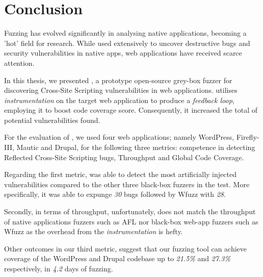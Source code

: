 \chapter{Conclusion}
\label{sec:conclusion}
\vspace*{0.25cm}

Fuzzing has evolved significantly in analysing native applications, becoming a 'hot' field for research. While used extensively to uncover destructive bugs and security vulnerabilities in native apps, web applications have received scarce attention.

In this thesis, we presented \pname{}, a prototype open-source grey-box fuzzer for discovering Cross-Site Scripting vulnerabilities in web applications. \pname{} utilises \emph{instrumentation} on the target web application to produce a \emph{feedback loop}, employing it to boost code coverage score.
Consequently, it increased the total of potential vulnerabilities found.

For the evaluation of \pname{}, we used four web applications; namely WordPress, Firefly-III, Mautic and Drupal, for the following three metrics: competence in detecting Reflected Cross-Site Scripting bugs, Throughput and Global Code Coverage.

Regarding the first metric, \pname{} was able to detect the most artificially injected vulnerabilities compared to the other three black-box fuzzers in the test. More specifically, it was able to expunge \emph{30} bugs followed by Wfuzz with \emph{28}. 

Secondly, in terms of throughput, unfortunately, \pname{} does not match the throughput of native applications fuzzers such as AFL nor black-box web-app fuzzers such as Wfuzz as the overhead from the \emph{instrumentation} is hefty. 

Other outcomes in our third metric, suggest that our fuzzing tool can achieve coverage of the WordPress and Drupal codebase up to \emph{21.5\%} and \emph{27.3\%} respectively, in \emph{4.2} days of fuzzing.